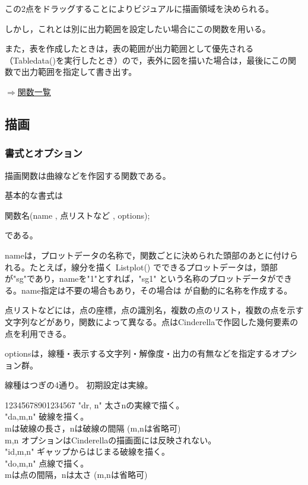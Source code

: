 \documentclass[papersize,a4paper,12pt,uplatex]{jsarticle}
\begin{document}
\begin{description}
この2点をドラッグすることによりビジュアルに描画領域を決められる。

しかし，これとは別に出力範囲を設定したい場合にこの関数を用いる。

また，表を作成したときは，表の範囲が出力範囲として優先される（Tabledata()を実行したとき）ので，表外に図を描いた場合は，最後にこの関数で出力範囲を指定して書き出す。

\begin{flushright}  \hyperlink{functionlist}{$\Rightarrow$関数一覧}\end{flushright}

\end{description}

\newpage
\subsection{描画}
\subsubsection{書式とオプション}

描画関数は曲線などを作図する関数である。

基本的な書式は

\hspace{20mm} 関数名(name , 点リストなど , options);

である。

nameは，プロットデータの名称で，関数ごとに決められた頭部のあとに付けられる。たとえば，線分を描く Listplot() でできるプロットデータは，頭部が"sg"であり，nameを"1"とすれば，"sg1" という名称のプロットデータができる。name指定は不要の場合もあり，その場合は \ketcindy が自動的に名称を作成する。

点リストなどには，点の座標，点の識別名，複数の点のリスト，複数の点を示す文字列などがあり，関数によって異なる。点はCinderellaで作図した幾何要素の点を利用できる。

optionsは，線種・表示する文字列・解像度・出力の有無などを指定するオプション群。

 線種はつぎの4通り。 初期設定は実線。

\begin{tabbing}
1234\=5678901234567\=\kill
  \>    "dr, n"     \>太さnの実線で描く。\\
  \>    "da,m,n"  \>破線を描く。\\
  \>                \> mは破線の長さ，nは破線の間隔  (m,nは省略可)\\
  \>                 \>m,n オプションはCinderellaの描画面には反映されない。\\
  \>    "id,m,n"   \>ギャップからはじまる破線を描く。\\
  \>    "do,m,n"  \>点線で描く。\\
  \>                \>mは点の間隔，nは太さ  (m,nは省略可)
\end{tabbing}
\end{document}
